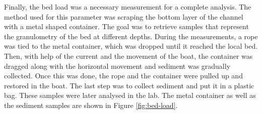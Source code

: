 
Finally, the bed load was a necessary measurement for a complete analysis. The method used for this parameter was scraping the bottom layer of the channel with a metal shaped container. The goal was to retrieve samples that represent the granulometry of the bed at different depths. 
During the measurements, a rope was tied to the metal container, which was dropped until it reached the local bed. Then, with help of the current and the movement of the boat, the container was dragged along with the horizontal movement and sediment was gradually collected. Once this was done, the rope and the container were pulled up and restored in the boat. The last step was to collect sediment and put it in a plastic bag. These samples were later analysed in the lab. The metal container as well as the sediment samples are shown in Figure \ref{fig:bed-load}.

